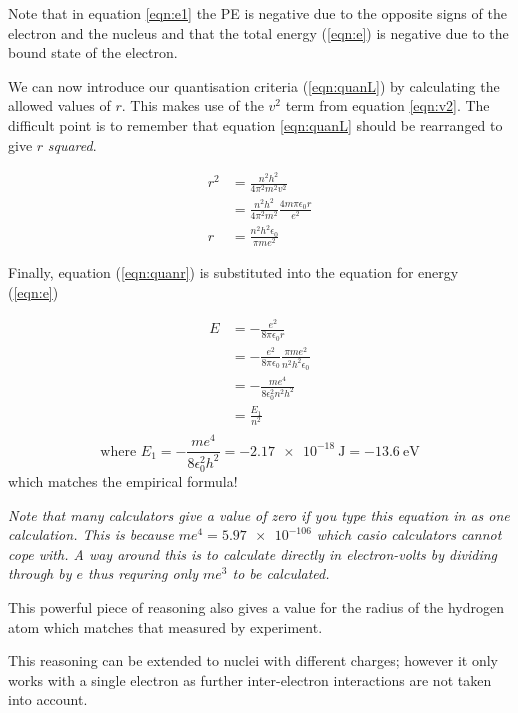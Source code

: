 \documentclass[revision-guide.tex]{subfiles}
\begin{document}
Note that in equation \ref{eqn:e1} the PE is negative due to the opposite signs of the electron and the nucleus and that the total energy (\ref{eqn:e}) is negative due to the bound state of the electron.

We can now introduce our quantisation criteria (\ref{eqn:quanL}) by calculating the allowed values of $r$. This makes use of the $v^2$ term from equation \ref{eqn:v2}. The difficult point is to remember that equation \ref{eqn:quanL} should be rearranged to give $r$ \emph{squared}.

\begin{align}
  r^2 &= \frac{n^2 h^2}{4\pi^2 m^2 v^2}\\
  &= \frac{n^2 h^2}{4\pi^2 m^2} \frac{4m\pi\epsilon_0 r}{e^2}\\
  r &= \frac{n^2h^2\epsilon_0}{\pi m e^2} \label{eqn:quanr}
\end{align}

Finally, equation (\ref{eqn:quanr}) is substituted into the equation for energy (\ref{eqn:e})

\begin{align*}
  E &= -\frac{e^2}{8\pi\epsilon_0 r}\\
  &=  -\frac{e^2}{8\pi\epsilon_0} \frac{\pi m e^2}{n^2h^2\epsilon_0} \\
  &= - \frac{me^4}{8\epsilon_0^2 n^2 h^2}\\
  &= \frac{E_1}{n^2}\\
\end{align*}
\[   \text{where } E_1 = -\frac{me^4}{8\epsilon_0^2 h^2} = \SI{-2.17e-18}{\joule} = \SI{-13.6}{\electronvolt} \]
which matches the empirical formula!

\emph{Note that many calculators give a value of zero if you type this equation in as one calculation. This is because $me^4 = \num{5.97e-106}$ which casio calculators cannot cope with. A way around this is to calculate directly in electron-volts by dividing through by $e$ thus requring only $me^3$ to be calculated.}

This powerful piece of reasoning also gives a value for the radius of the hydrogen atom which matches that measured by experiment.

This reasoning can be extended to nuclei with different charges; however it only works with a single electron as further inter-electron interactions are not taken into account.
\end{document}
